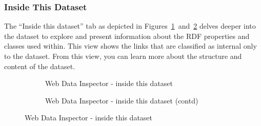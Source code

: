 \subsubsection{Inside This Dataset}

The ``Inside this dataset'' tab as depicted in Figures~\ref{fig:wdi:insideThisDataset1}~and~\ref{fig:wdi:insideThisDataset2} delves deeper into the dataset to explore and present information about the RDF properties and classes used within. This view shows the links that are classified as internal only to the dataset. From this view, you can learn more about the structure and content of the dataset.

\begin{figure}
	\centering
	\begin{subfigure}{.9\textwidth}
		\centering
		\caption{Web Data Inspector - inside this dataset}
		\label{fig:wdi:insideThisDataset1}
	\end{subfigure}
	\quad
	\begin{subfigure}{.9\textwidth}
		\centering
		\caption{Web Data Inspector - inside this dataset (contd)}
		\label{fig:wdi:insideThisDataset2}
	\end{subfigure}
	\caption{Web Data Inspector - inside this dataset}
	\label{fig:wdi:insideThisDataset}
\end{figure}

